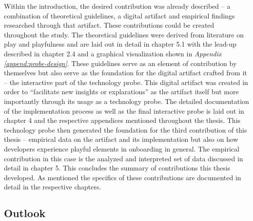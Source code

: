Within the introduction, the desired contribution was already described -- a combination of theoretical guidelines, a digital artifact and empirical findings researched through that artifact. These contributions could be created throughout the study. The theoretical guidelines were derived from literature on play and playfulness and are laid out in detail in chapter 5.1 with the lead-up described in chapter 2.4 and a graphical visualization shown in \textit{Appendix \ref{append:probe-design}}. These guidelines serve as an element of contribution by themselves but also serve as the foundation for the digital artifact crafted from it -- the interactive part of the technology probe. This digital artifact was created in order to \enquote{facilitate new insights or explarations} \cite[p. 2]{wobbrock2016research} as the artifact itself but more importantly through its usage as a technology probe. The detailed documentation of the implementation process as well as the final interactive probe is laid out in chapter 4 and the respective appendices mentioned throughout the thesis. This technology probe then generated the foundation for the third contribution of this thesis -- empirical data on the artifact and its implementation but also on how developers experience playful elements in onboarding in general. The empirical contribution in this case is the analyzed and interpreted set of data discussed in detail in chapter 5. This concludes the summary of contributions this thesis developed. As mentioned the specifics of these contributions are documented in detail in the respective chapters.

\subsection{Outlook}






